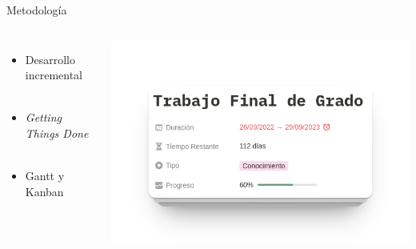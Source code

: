     \begin{frame}{Metodología}
        \begin{columns}[c]
                \begin{itemize}
                    \item Desarrollo incremental
                    \\~\\
                    \item \textit{Getting Things Done}
                    \\~\\
                    \item Gantt y Kanban
                \end{itemize}
            
                \includegraphics[scale=0.25]{images/capturas/notion.png}
        \end{columns}
    \end{frame}

